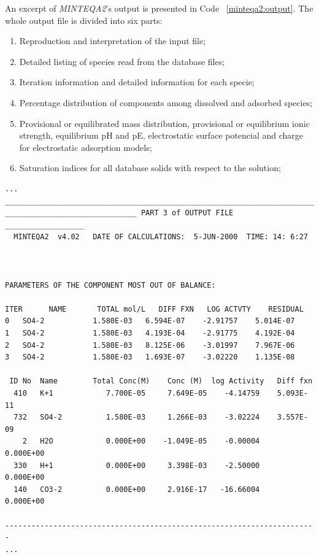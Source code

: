 An excerpt of \emph{MINTEQA2}'s output is presented in Code ~\ref{minteqa2:output}. The whole output file is divided into six parts:
\begin{enumerate}
\item Reproduction and interpretation of the input file;
\item Detailed listing of species read from the database files;
\item Iteration information and detailed information for each specie;
\item Percentage distribution of components among dissolved and adsorbed species;
\item Provisional or equilibrated mass distribution, provisional or equilibrium ionic strength, equilibrium pH and pE, electrostatic surface potencial and charge for electrostatic adsorption models;
\item Saturation indices for all database solids with respect to the solution;
\end{enumerate}


\begin{minipage}[c]{0.92\textwidth}
\begin{lstlisting}[frame=single, caption=\emph{MINTEQA2}'s excerpt from the output file, label=minteqa2:output]
...
_______________________________________________________________________
______________________________ PART 3 of OUTPUT FILE __________________
  MINTEQA2  v4.02   DATE OF CALCULATIONS:  5-JUN-2000  TIME: 14: 6:27



PARAMETERS OF THE COMPONENT MOST OUT OF BALANCE:

ITER      NAME       TOTAL mol/L   DIFF FXN   LOG ACTVTY    RESIDUAL
0   SO4-2           1.580E-03   6.594E-07    -2.91757    5.014E-07
1   SO4-2           1.580E-03   4.193E-04    -2.91775    4.192E-04
2   SO4-2           1.580E-03   8.125E-06    -3.01997    7.967E-06
3   SO4-2           1.580E-03   1.693E-07    -3.02220    1.135E-08

 ID No  Name        Total Conc(M)    Conc (M)  log Activity   Diff fxn
  410   K+1            7.700E-05     7.649E-05    -4.14759    5.093E-11
  732   SO4-2          1.580E-03     1.266E-03    -3.02224    3.557E-09
    2   H2O            0.000E+00    -1.049E-05    -0.00004    0.000E+00
  330   H+1            0.000E+00     3.398E-03    -2.50000    0.000E+00
  140   CO3-2          0.000E+00     2.916E-17   -16.66004    0.000E+00

-----------------------------------------------------------------------
...
\end{lstlisting}
\end{minipage}

